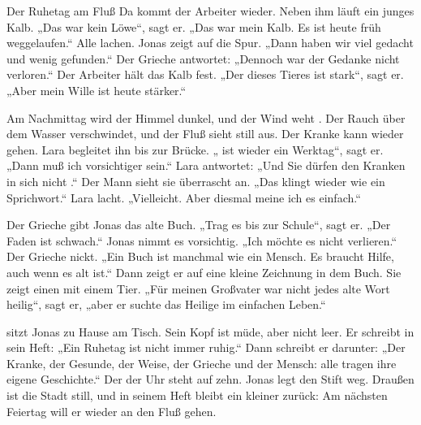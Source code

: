 \documentclass[12pt]{nextbook}
\begin{document}
\begin{readersection}{Der Ruhetag am Fluß}
Da kommt der Arbeiter wieder. Neben ihm läuft ein junges Kalb. „Das war kein Löwe“, sagt er. „Das war mein Kalb. Es ist heute früh weggelaufen.“ Alle lachen. Jonas zeigt auf die Spur. „Dann haben wir viel gedacht und wenig gefunden.“ Der Grieche antwortet: „Dennoch war der Gedanke nicht verloren.“ Der Arbeiter hält das Kalb fest. „Der  dieses Tieres ist stark“, sagt er. „Aber mein Wille ist heute stärker.“

Am Nachmittag wird der Himmel dunkel, und der Wind weht . Der Rauch über dem Wasser verschwindet, und der Fluß sieht still aus. Der Kranke kann wieder gehen. Lara begleitet ihn bis zur Brücke. „ ist wieder ein Werktag“, sagt er. „Dann muß ich vorsichtiger sein.“ Lara antwortet: „Und Sie dürfen den Kranken in sich nicht .“ Der Mann sieht sie überrascht an. „Das klingt wieder wie ein Sprichwort.“ Lara lacht. „Vielleicht. Aber diesmal meine ich es einfach.“

Der Grieche gibt Jonas das alte Buch. „Trag es bis zur Schule“, sagt er. „Der Faden ist schwach.“ Jonas nimmt es vorsichtig. „Ich möchte es nicht verlieren.“ Der Grieche nickt. „Ein Buch ist manchmal wie ein Mensch. Es braucht Hilfe, auch wenn es alt ist.“ Dann zeigt er auf eine kleine Zeichnung in dem Buch. Sie zeigt einen  mit einem Tier. „Für meinen Großvater war nicht jedes alte Wort heilig“, sagt er, „aber er suchte das Heilige im einfachen Leben.“

 sitzt Jonas zu Hause am Tisch. Sein Kopf ist müde, aber nicht leer. Er schreibt in sein Heft: „Ein Ruhetag ist nicht immer ruhig.“ Dann schreibt er darunter: „Der Kranke, der Gesunde, der Weise, der Grieche und der Mensch: alle tragen ihre eigene Geschichte.“ Der  der Uhr steht auf zehn. Jonas legt den Stift weg. Draußen ist die Stadt still, und in seinem Heft bleibt ein kleiner  zurück: Am nächsten Feiertag will er wieder an den Fluß gehen.

\end{readersection}
\end{document}
